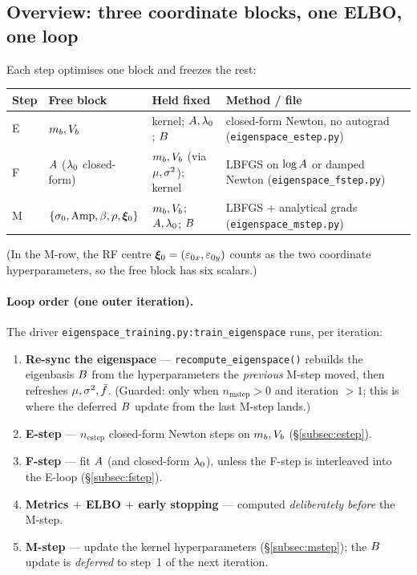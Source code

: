 \subsection{Overview: three coordinate blocks, one ELBO, one loop}
\label{subsec:training-overview}

Each step optimises one block and freezes the rest:

\begin{center}\small
\begin{tabular}{@{}l l l >{\raggedright\arraybackslash}p{2.35in}@{}}
\toprule
Step & Free block & Held fixed & Method / file \\
\midrule
E & $m_{b},V_{b}$ & kernel; $A,\lambda_{0}$; $B$ &
    closed-form Newton, no autograd (\texttt{eigenspace\_estep.py}) \\
F & $A$ ($\lambda_{0}$ closed-form) & $m_{b},V_{b}$ (via $\mu,\sigma^{2}$); kernel &
    LBFGS on $\log A$ or damped Newton (\texttt{eigenspace\_fstep.py}) \\
M & $\{\sigma_{0},\mathrm{Amp},\beta,\rho,\bm{\xi}_{0}\}$ & $m_{b},V_{b}$; $A,\lambda_{0}$; $B$ &
    LBFGS $+$ analytical grads (\texttt{eigenspace\_mstep.py}) \\
\bottomrule
\end{tabular}
\end{center}

\noindent(In the M-row, the RF centre $\bm{\xi}_{0}=(\varepsilon_{0x},\varepsilon_{0y})$
counts as the two coordinate hyperparameters, so the free block has six scalars.)

\paragraph{Loop order (one outer iteration).}
The driver \texttt{eigenspace\_training.py:train\_eigenspace} runs, per iteration:

\begin{enumerate}[leftmargin=2.4em,itemsep=1pt]
  \item \textbf{Re-sync the eigenspace} --- \texttt{recompute\_eigenspace()}
        rebuilds the eigenbasis $B$ from the hyperparameters the \emph{previous}
        M-step moved, then refreshes $\mu,\sigma^{2},\bar{f}$. (Guarded: only when
        $n_{\mathrm{mstep}}>0$ and iteration $>1$; this is where the deferred
        $B$ update from the last M-step lands.)
  \item \textbf{E-step} --- $n_{\mathrm{estep}}$ closed-form Newton steps on
        $m_{b},V_{b}$ (\S\ref{subsec:estep}).
  \item \textbf{F-step} --- fit $A$ (and closed-form $\lambda_{0}$), unless the
        F-step is interleaved into the E-loop (\S\ref{subsec:fstep}).
  \item \textbf{Metrics $+$ ELBO $+$ early stopping} --- computed
        \emph{deliberately before} the M-step.
  \item \textbf{M-step} --- update the kernel hyperparameters
        (\S\ref{subsec:mstep}); the $B$ update is \emph{deferred} to step~1 of
        the next iteration.
\end{enumerate}

